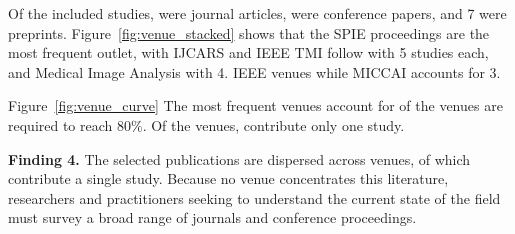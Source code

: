 Of the  included studies,   were journal articles,   were conference papers, and 7  were preprints. Figure~\ref{fig:venue_stacked} shows that the SPIE proceedings are the most frequent outlet, with   IJCARS and IEEE TMI follow with 5 studies each, and Medical Image Analysis with 4. IEEE venues  while MICCAI accounts for 3.



Figure~\ref{fig:venue_curve}  The  most frequent venues account for  of the   venues are required to reach 80\%. Of the  venues,  contribute only one study.

\vspace{0.25cm}
\begin{mdframed}[linewidth=0.5pt, linecolor=black, backgroundcolor=blue!10]
\textbf{Finding 4.} The selected  publications are dispersed across  venues,  of which contribute a single study. Because no venue concentrates this literature, researchers and practitioners seeking to understand the current state of the field must survey a broad range of journals and conference proceedings.
\end{mdframed}
\vspace{0.25cm}

